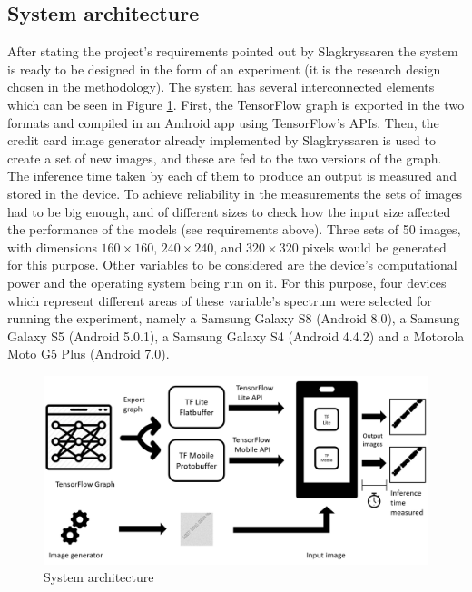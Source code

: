 \subsection{System architecture}
After stating the project's requirements pointed out by Slagkryssaren the system is ready to be designed in the form of an experiment (it is the research design chosen in the methodology). The system has several interconnected elements which can be seen in Figure \ref{fig:system}. First, the TensorFlow graph is exported in the two formats and compiled in an Android app using TensorFlow's APIs. Then, the credit card image generator already implemented by Slagkryssaren is used to create a set of new images, and these are fed to the two versions of the graph. The inference time taken by each of them to produce an output is measured and stored in the device. To achieve reliability in the measurements the sets of images had to be big enough, and of different sizes to check how the input size affected the performance of the models (see requirements above). Three sets of 50 images, with dimensions $ 160\times160 $, $ 240\times240 $, and $ 320\times320 $ pixels would be generated for this purpose. Other variables to be considered are the device's computational power and the operating system being run on it. For this purpose, four devices which represent different areas of these variable's spectrum were selected for running the experiment, namely a Samsung Galaxy S8 (Android 8.0), a Samsung Galaxy S5 (Android 5.0.1), a Samsung Galaxy S4 (Android 4.4.2) and a Motorola Moto G5 Plus (Android 7.0). 
\begin{figure}[h!]
  \includegraphics[width=\linewidth]{img/system.png}
  \caption{\small System architecture}
  \label{fig:system}
\end{figure}

